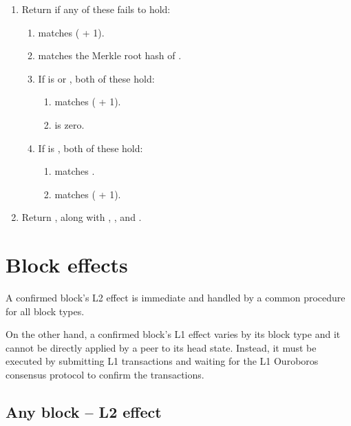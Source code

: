 \documentclass[../hydrozoa.tex]{subfiles}
\begin{document}
\begin{enumerate}
\begin{enumerate}
    \end{enumerate}
  \item Return  if any of these fails to hold:
    \begin{enumerate}
      \item {} matches ( + 1).
      \item {} matches the Merkle root hash of .
      \item If  is  or , both of these hold:
        \begin{enumerate}
          \item {} matches ( + 1).
          \item {} is zero.
        \end{enumerate}
      \item If  is , both of these hold:
        \begin{enumerate}
          \item {} matches .
          \item {} matches ( + 1).
        \end{enumerate}
    \end{enumerate}
  \item Return , along with , , and .
\end{enumerate}

\section{Block effects}%
\label{h:l2-block-effects}%

A confirmed block's L2 effect is immediate and handled by a common procedure for all block types.

On the other hand, a confirmed block's L1 effect varies by its block type and it cannot be directly applied by a peer to its head state.
Instead, it must be executed by submitting L1 transactions and waiting for the L1 Ouroboros consensus protocol to confirm the transactions.

\subsection{Any block -- L2 effect}%
\label{h:l2-block-effect-l2}%
\end{document}
